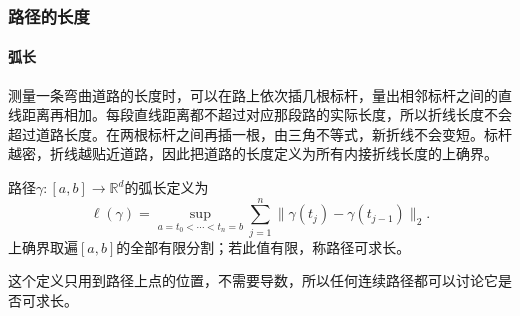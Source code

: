 \subsubsection{路径的长度}

\paragraph{弧长}

测量一条弯曲道路的长度时，可以在路上依次插几根标杆，量出相邻标杆之间的直线距离再相加。每段直线距离都不超过对应那段路的实际长度，所以折线长度不会超过道路长度。在两根标杆之间再插一根，由三角不等式，新折线不会变短。标杆越密，折线越贴近道路，因此把道路的长度定义为所有内接折线长度的上确界。
\begin{definition}[路径的弧长]
路径$\gamma:[a,b]\to\mathbb R^d$的弧长定义为
\[
 \ell(\gamma)=\sup_{a=t_0<\cdots<t_n=b}
 \sum_{j=1}^n\lVert\gamma(t_j)-\gamma(t_{j-1})\rVert_2.
\]
上确界取遍$[a,b]$的全部有限分割；若此值有限，称路径可求长。
\end{definition}

这个定义只用到路径上点的位置，不需要导数，所以任何连续路径都可以讨论它是否可求长。

